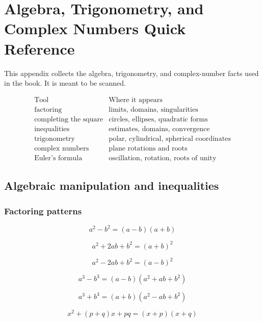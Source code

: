 
\chapter{Algebra, Trigonometry, and Complex Numbers Quick Reference}
\label{app:algebra-trig-complex}

This appendix collects the algebra, trigonometry, and complex-number facts used in the
book.  It is meant to be scanned.

\[
\begin{array}{c|c}
\text{Tool} & \text{Where it appears} \\ \hline
\text{factoring} & \text{limits, domains, singularities}\\[1mm]
\text{completing the square} & \text{circles, ellipses, quadratic forms}\\[1mm]
\text{inequalities} & \text{estimates, domains, convergence}\\[1mm]
\text{trigonometry} & \text{polar, cylindrical, spherical coordinates}\\[1mm]
\text{complex numbers} & \text{plane rotations and roots}\\[1mm]
\text{Euler's formula} & \text{oscillation, rotation, roots of unity}
\end{array}
\]

\section{Algebraic manipulation and inequalities}
\label{app:B.1}

\subsection*{Factoring patterns}

\[
\boxed{
    a^2-b^2=(a-b)(a+b)
}
\]

\[
\boxed{
    a^2+2ab+b^2=(a+b)^2
}
\]

\[
\boxed{
    a^2-2ab+b^2=(a-b)^2
}
\]

\[
\boxed{
    a^3-b^3=(a-b)(a^2+ab+b^2)
}
\]

\[
\boxed{
    a^3+b^3=(a+b)(a^2-ab+b^2)
}
\]

\[
\boxed{
    x^2+(p+q)x+pq=(x+p)(x+q)
}
\]

